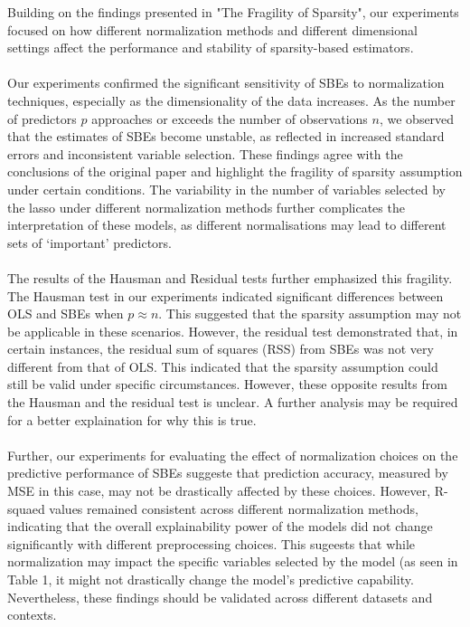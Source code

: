 Building on the findings presented in "The Fragility of Sparsity", our experiments focused on how different normalization methods and different dimensional settings affect the performance and stability of sparsity-based estimators. \\
\\
Our experiments confirmed the significant sensitivity of SBEs to normalization techniques, especially as the dimensionality of the data increases. As the number of predictors $p$ approaches or exceeds the number of observations $n$, we observed that the estimates of SBEs become unstable, as reflected in increased standard errors and inconsistent variable selection. These findings agree with the conclusions of the original paper and highlight the fragility of sparsity assumption under certain conditions. The variability in the number of variables selected by the lasso under different normalization methods further complicates the interpretation of these models, as different normalisations may lead to different sets of `important' predictors. \\
\\
The results of the Hausman and Residual tests further emphasized this fragility. The Hausman test in our experiments indicated significant differences between OLS and SBEs when $p \approx n$. This suggested that the sparsity assumption may not be applicable in these scenarios. However, the residual test demonstrated that, in certain instances, the residual sum of squares (RSS) from SBEs was not very different from that of OLS. This indicated that the sparsity assumption could still be valid under specific circumstances. However, these opposite results from the Hausman and the residual test is unclear. A further analysis may be required for a better explaination for why this is true. \\
\\
Further, our experiments for evaluating the effect of normalization choices on the predictive performance of SBEs suggeste that prediction accuracy, measured by MSE in this case, may not be drastically affected by these choices. However, R-squaed values remained consistent across different normalization methods, indicating that the overall explainability power of the models did not change significantly with different preprocessing choices. This sugeests that while normalization may impact the specific variables selected by the model (as seen in Table 1, it might not drastically change the model's predictive capability. Nevertheless, these findings should be validated across different datasets and contexts. \\
